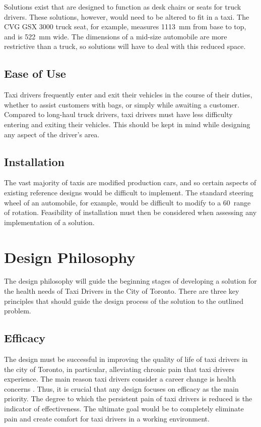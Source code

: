 \documentclass[11pt]{article}
\begin{document}
Solutions exist that are designed to function as desk chairs or seats for truck
drivers. These solutions, however, would need to be altered to fit in
a taxi. The CVG GSX 3000 truck seat, for example, measures 1113~mm from base
to top, and is 522~mm wide. The dimensions of a mid-size automobile
are more restrictive than a truck, so solutions will have to deal with
this reduced space.

\subsection{Ease of Use}
\label{sec:ease}
Taxi drivers frequently enter and exit their vehicles in the course of
their duties, whether to assist customers with bags, or simply while awaiting
a customer. Compared to long-haul truck drivers, taxi drivers must have less
difficulty entering and exiting their vehicles. This should be kept in mind
while designing any aspect of the driver's area.
\subsection{Installation}
\label{sec:installation}

The vast majority of taxis are modified production cars, %
and so certain aspects of existing reference designs would be difficult to
implement. The standard steering wheel of an automobile, for example,
would be difficult to modify to a 60\textdegree~range of
rotation\cite{Ismail2003}. Feasibility of installation must then
be considered when assessing any implementation of a solution.

\section{Design Philosophy}
\label{sec:philo}
The design philosophy will guide the beginning stages of developing a
solution for the health needs of Taxi Drivers in the City of
Toronto. There are three key principles that should
guide the design process of the solution to the outlined problem.
 
\subsection{Efficacy}
The design must be successful in improving the quality of life of taxi 
drivers in the city of Toronto, in particular, alleviating chronic pain 
that taxi drivers experience. The main reason taxi drivers consider a 
career change is health concerns \cite{chicago}. Thus, it is crucial that 
any design focuses on efficacy as the main priority. The degree to which 
the persistent pain of taxi drivers is reduced is the indicator of 
effectiveness. The ultimate goal would be to completely eliminate pain 
and create comfort for taxi drivers in a working environment. 
\end{document}
